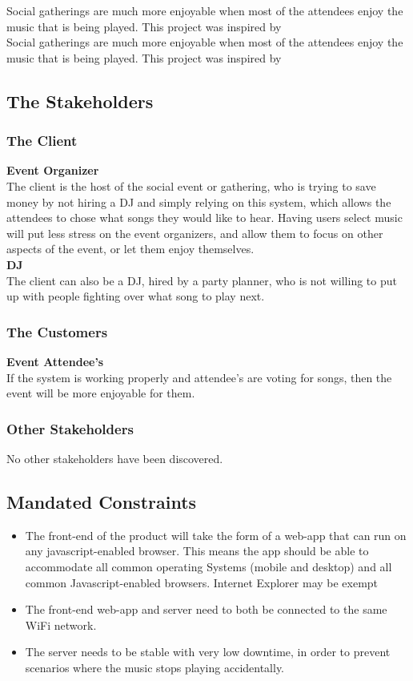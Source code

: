 \documentclass[12pt, titlepage]{article}
\begin{document}
Social gatherings are much more enjoyable when most of the attendees enjoy
the music that is being played. This project was inspired by \\

Social gatherings are much more enjoyable when most of the attendees enjoy
the music that is being played. This project was inspired by

\subsection{The Stakeholders}

\subsubsection{The Client}

\textbf{Event Organizer}\\
The client is the host of the social event or gathering, who is trying to save
money by not hiring a DJ and simply relying on this system, which allows the
attendees to chose what songs they would like to hear. Having users select music
will put less stress on the event organizers, and allow them to focus on other
aspects of the event, or let them enjoy themselves. \\ \textbf{DJ} \\ The client
 can also be a DJ, hired by a party planner, who is not willing to put up with
  people fighting over what song to play next.

\subsubsection{The Customers}

\textbf{Event Attendee's}\\
If the system is working properly and attendee's are voting for songs, then
the event will be more enjoyable for them.
\subsubsection{Other Stakeholders}


No other stakeholders have been discovered.

\subsection{Mandated Constraints}

\begin{itemize}
\item The front-end of the product will take the form of a web-app that can
run on any javascript-enabled browser. This means the app should be able to
accommodate all common operating Systems (mobile and desktop) and all
common Javascript-enabled browsers. Internet Explorer may be exempt
\item The front-end web-app and server need to both be connected to the same
WiFi network.
\item The server needs to be stable with very low downtime, in order to prevent
scenarios where the music stops playing accidentally.
\end{itemize}
\end{document}
